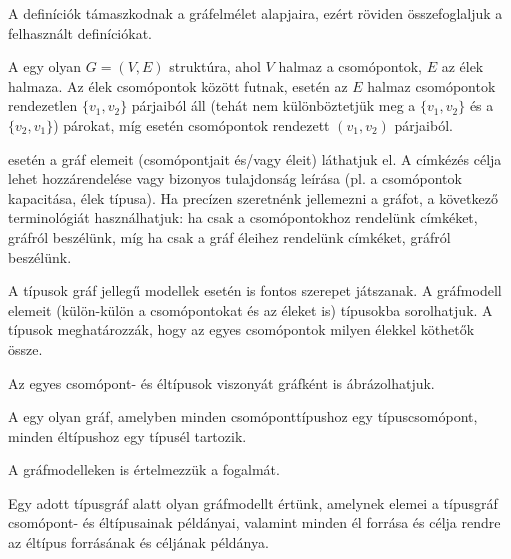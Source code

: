 \begin{kisdefiniciok}
	A definíciók támaszkodnak a gráfelmélet alapjaira, ezért röviden összefoglaljuk a felhasznált definíciókat.

	A  egy olyan $G = (V, E)$ struktúra, ahol $V$ halmaz a csomópontok, $E$ az élek halmaza. Az élek csomópontok között futnak,  esetén az $E$ halmaz csomópontok rendezetlen $\{v_1, v_2\}$ párjaiból áll (tehát nem különböztetjük meg a $\{v_1, v_2\}$ és a $\{v_2, v_1\}$) párokat, míg  esetén csomópontok rendezett $(v_1, v_2)$ párjaiból.

	 esetén a gráf elemeit (csomópontjait és/vagy éleit)  láthatjuk el. A címkézés célja lehet  hozzárendelése vagy bizonyos tulajdonság leírása (pl. a csomópontok kapacitása, élek típusa). Ha precízen szeretnénk jellemezni a gráfot, a következő terminológiát használhatjuk: ha csak a csomópontokhoz rendelünk címkéket,  gráfról beszélünk, míg ha csak a gráf éleihez rendelünk címkéket,  gráfról beszélünk.

\end{kisdefiniciok}

A típusok gráf jellegű modellek esetén is fontos szerepet játszanak. A gráfmodell elemeit (külön-külön a csomópontokat és az éleket is) típusokba sorolhatjuk. A típusok meghatározzák, hogy az egyes csomópontok milyen élekkel köthetők össze.

Az egyes csomópont- és éltípusok viszonyát gráfként is ábrázolhatjuk.

\begin{definicio}
	A  egy olyan gráf, amelyben minden csomóponttípushoz egy típuscsomópont, minden éltípushoz egy típusél tartozik.
\end{definicio}

A gráfmodelleken is értelmezzük a  fogalmát.

\begin{definicio}
	Egy adott típusgráf  alatt olyan gráfmodellt értünk, amelynek elemei a típusgráf csomópont- és éltípusainak példányai, valamint minden él forrása és célja rendre az éltípus forrásának és céljának példánya.
\end{definicio}

